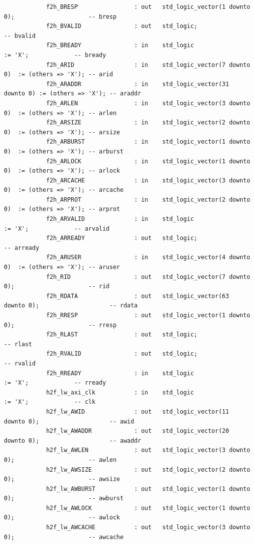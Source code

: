 \documentclass[conference]{IEEEtran}
\begin{document}
\begin{lstlisting}
			f2h_BRESP                : out   std_logic_vector(1 downto 0);                     -- bresp
			f2h_BVALID               : out   std_logic;                                        -- bvalid
			f2h_BREADY               : in    std_logic                     := 'X';             -- bready
			f2h_ARID                 : in    std_logic_vector(7 downto 0)  := (others => 'X'); -- arid
			f2h_ARADDR               : in    std_logic_vector(31 downto 0) := (others => 'X'); -- araddr
			f2h_ARLEN                : in    std_logic_vector(3 downto 0)  := (others => 'X'); -- arlen
			f2h_ARSIZE               : in    std_logic_vector(2 downto 0)  := (others => 'X'); -- arsize
			f2h_ARBURST              : in    std_logic_vector(1 downto 0)  := (others => 'X'); -- arburst
			f2h_ARLOCK               : in    std_logic_vector(1 downto 0)  := (others => 'X'); -- arlock
			f2h_ARCACHE              : in    std_logic_vector(3 downto 0)  := (others => 'X'); -- arcache
			f2h_ARPROT               : in    std_logic_vector(2 downto 0)  := (others => 'X'); -- arprot
			f2h_ARVALID              : in    std_logic                     := 'X';             -- arvalid
			f2h_ARREADY              : out   std_logic;                                        -- arready
			f2h_ARUSER               : in    std_logic_vector(4 downto 0)  := (others => 'X'); -- aruser
			f2h_RID                  : out   std_logic_vector(7 downto 0);                     -- rid
			f2h_RDATA                : out   std_logic_vector(63 downto 0);                    -- rdata
			f2h_RRESP                : out   std_logic_vector(1 downto 0);                     -- rresp
			f2h_RLAST                : out   std_logic;                                        -- rlast
			f2h_RVALID               : out   std_logic;                                        -- rvalid
			f2h_RREADY               : in    std_logic                     := 'X';             -- rready
			h2f_lw_axi_clk           : in    std_logic                     := 'X';             -- clk
			h2f_lw_AWID              : out   std_logic_vector(11 downto 0);                    -- awid
			h2f_lw_AWADDR            : out   std_logic_vector(20 downto 0);                    -- awaddr
			h2f_lw_AWLEN             : out   std_logic_vector(3 downto 0);                     -- awlen
			h2f_lw_AWSIZE            : out   std_logic_vector(2 downto 0);                     -- awsize
			h2f_lw_AWBURST           : out   std_logic_vector(1 downto 0);                     -- awburst
			h2f_lw_AWLOCK            : out   std_logic_vector(1 downto 0);                     -- awlock
			h2f_lw_AWCACHE           : out   std_logic_vector(3 downto 0);                     -- awcache

\end{lstlisting}
\end{document}

